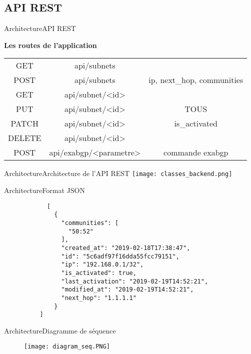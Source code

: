 \subsection{API REST}

\begin{frame}{Architecture}{API REST}

\textbf{Les routes de l'application}

\begin{table}
    \begin{tabulary}{\textwidth}{|C C C|}
        \hline
        \color{background}{Méthode HTTP} & \color{background}{URI} & \color{background}{Paramètre(s)}\\
        \hline
	    GET & api/subnets & \\
	    POST & api/subnets & ip, next\_hop, communities \\
	    \hline
	    GET & api/subnet/<id> & \\
	    PUT & api/subnet/<id> & TOUS \\
	    PATCH & api/subnet/<id> & is\_activated \\
	    DELETE & api/subnet/<id> & \\
	    \hline
	    POST & api/exabgp/<parametre> & commande exabgp \\
	    \hline
	\end{tabulary}
\end{table}
\end{frame}

\begin{frame}{Architecture}{Architecture de l'API REST}
    \texttt{[image: classes\_backend.png]}
\end{frame}

\begin{frame}[fragile]{Architecture}{Format JSON}
    \begin{minipage}{0.3\textwidth}
        \begin{verbatim}
            [
              {
                "communities": [
                  "50:52"
                ],
                "created_at": "2019-02-18T17:38:47",
                "id": "5c6adf97f16dda55fcc79151",
                "ip": "192.168.0.1/32",
                "is_activated": true,
                "last_activation": "2019-02-19T14:52:21",
                "modified_at": "2019-02-19T14:52:21",
                "next_hop": "1.1.1.1"
              }
          ]
        \end{verbatim}
    \end{minipage}
\end{frame}

\begin{frame}{Architecture}{Diagramme de séquence}
    \begin{figure}
         \centering
        \texttt{[image: diagram\_seq.PNG]}
        \label{fig:my_label}
    \end{figure}

\end{frame}
